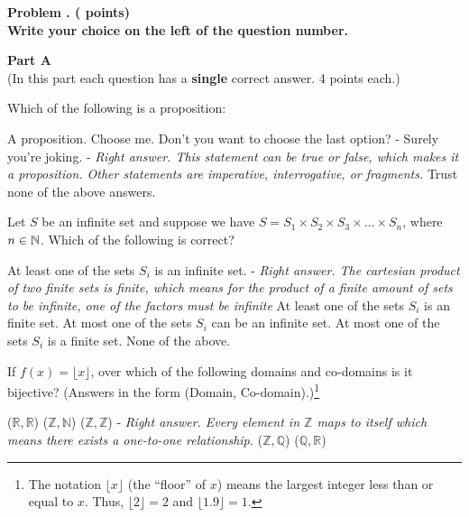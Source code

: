 
\newpage

\addtocounter{problemctr}{1}

{\bf
Problem \theproblemctr.  (\thechoices\xspace points)}
\\

{\bf Write your choice on the left of the question number.}


\begin{center}
{\bf Part A}\\
\medskip
(In this part each question has a {\bf single} correct answer. 4 points each.)
\end{center}
\bigskip

\begin{questions}

\question Which of the following is a proposition:
\begin{choices}
\choice A proposition.
\choice Choose me.
\choice Don't you want to choose the last option? - 
\choice Surely you're joking. - \textit{Right answer. This statement can be true or false, which makes it a proposition. Other statements are imperative, interrogative, or fragments.}
\choice Trust none of the above answers.
\end{choices}

\vspace{1.8in}

\question Let $S$ be an infinite set and suppose we have $S=S_1\times S_2 \times S_3\times \dots \times S_n$, where $n\in {\mathbb N}{}$. Which of the following is correct?
\begin{choices}
\choice At least one of the sets $S_i$ is an infinite set. - \textit{Right answer. The cartesian product of two finite sets is finite, which means for the product of a finite amount of sets to be infinite, one of the factors must be infinite}
\choice At least one of the sets $S_i$ is an finite set. 
\choice At most one of the sets $S_i$ can be an infinite set.
\choice At most one of the sets $S_i$ is a finite set.
\choice None of the above.
\end{choices}


\newpage

\question If $f(x) = \lfloor x \rfloor$, over which of the following
domains and co-domains is it bijective? (Answers in the form (Domain,
Co-domain).)\footnote{The notation $\lfloor x\rfloor$ (the ``floor''
  of $x$) means the largest integer less than or equal to $x$.  Thus,
  $\lfloor 2\rfloor=2$ and $\lfloor 1.9\rfloor=1$.}
\begin{choices}
\choice ($\mathbb{R}, \mathbb{R}$) 
\choice ($\mathbb{Z}, \mathbb{N}$) 
\choice ($\mathbb{Z}, \mathbb{Z}$) - \textit{Right answer. Every element in $\mathbb{Z}$ maps to itself which means there exists a one-to-one relationship.}
\choice ($\mathbb{Z}, \mathbb{Q}$) 
\choice ($\mathbb{Q}, \mathbb{R}$) 
\end{choices}


\end{questions}
